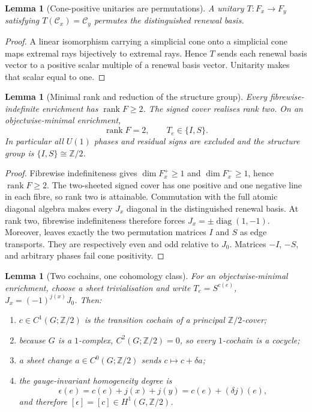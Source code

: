 \documentclass[11pt]{article}
\newtheorem{lemma}[theorem]{Lemma}
\theoremstyle{definition}
\theoremstyle{remark}
\newcommand{\Z}{\mathbb{Z}}
\newcommand{\rank}{\operatorname{rank}}
\newcommand{\diag}{\operatorname{diag}}
\begin{document}
\begin{lemma}[Cone-positive unitaries are permutations]
\label{lem:cone-positive-permutation}
A unitary \(T:F_x\to F_y\) satisfying
\(T(\mathcal C_x)=\mathcal C_y\) permutes the distinguished renewal basis.
\end{lemma}

\begin{proof}
A linear isomorphism carrying a simplicial cone onto a simplicial cone maps
extremal rays bijectively to extremal rays.  Hence \(T\) sends each renewal basis
vector to a positive scalar multiple of a renewal basis vector.  Unitarity makes
that scalar equal to one.
\end{proof}

\begin{lemma}[Minimal rank and reduction of the structure group]
\label{lem:minimal-rank-two}
Every fibrewise-indefinite enrichment has \(\rank F\ge2\).  The signed cover
realises rank two.  On an objectwise-minimal enrichment,
\[
  \rank F=2,\qquad T_e\in\{I,S\}.
\]
In particular all \(U(1)\) phases and residual signs are excluded and the
structure group is \(\{I,S\}\cong\Z/2\).
\end{lemma}

\begin{proof}
Fibrewise indefiniteness gives
\(\dim F_x^+\ge1\) and \(\dim F_x^-\ge1\), hence \(\rank F\ge2\).
The two-sheeted signed cover has one positive and one negative line in each
fibre, so rank two is attainable.  Commutation with the full atomic diagonal
algebra makes every \(J_x\) diagonal in the distinguished renewal basis.  At
rank two, fibrewise indefiniteness therefore forces
\(J_x=\pm\diag(1,-1)\).  Moreover,
 leaves exactly the two permutation
matrices \(I\) and \(S\) as edge transports.  They are respectively even and
odd relative to \(J_0\).  Matrices \(-I\), \(-S\), and arbitrary phases fail
cone positivity.
\end{proof}

\begin{lemma}[Two cochains, one cohomology class]
\label{lem:two-cochains-one-class}
For an objectwise-minimal enrichment, choose a sheet trivialisation and write
\(T_e=S^{c(e)}\), \(J_x=(-1)^{j(x)}J_0\).  Then:
\begin{enumerate}[label=\textup{(\roman*)},leftmargin=2.3em]
\item \(c\in C^1(G;\Z/2)\) is the transition cochain of a principal
      \(\Z/2\)-cover;
\item because \(G\) is a \(1\)-complex, \(C^2(G;\Z/2)=0\), so every
      \(1\)-cochain is a cocycle;
\item a sheet change \(a\in C^0(G;\Z/2)\) sends
      \(c\mapsto c+\delta a\);
\item the gauge-invariant homogeneity degree is
      \[
        \epsilon(e)=c(e)+j(x)+j(y)=c(e)+(\delta j)(e),
      \]
      and therefore \([\epsilon]=[c]\in H^1(G,\Z/2)\).
\end{enumerate}
\end{lemma}
\end{document}
